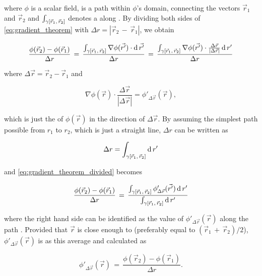 where $\phi$ is a scalar field, \textgammapath is a path within $\phi$'s domain, connecting the vectors $\vec{r}_1$ and $\vec{r}_2$ and $\int_{\gamma[\vec{r}_1,\,\vec{r}_2]}$ denotes a  along \textgammapath. By dividing both sides of \eqref{eq:gradient_theorem} with \mbox{$\Delta r = |\vec{r}_2\,-\,\vec{r}_1|$}, we obtain

\begin{equation} \label{eq:gradient_theorem_divided}
\frac{\phi(\vec{r}_2)-\phi(\vec{r}_1)}{\Delta r} \,=\, \frac{\int_{\gamma[\vec{r}_1,\,\vec{r}_2]}\nabla\phi(\vec{r'})\cdot \operatorname{d}\vec{r'}}{\Delta r} \,=\, \frac{\int_{\gamma[\vec{r}_1,\,\vec{r}_2]}\nabla\phi(\vec{r'})\cdot\frac{\Delta\vec{r}}{|\Delta\vec{r}|} \operatorname{d} r'}{\Delta r}
\end{equation}

where $\Delta\vec{r} = \vec{r}_2 -  \vec{r}_1$ and

\begin{equation}
\nabla\phi(\vec{r})\cdot\frac{\Delta\vec{r}}{|\Delta\vec{r}|} = \phi'_{\Delta\vec{r}}(\vec{r}),
\end{equation}

which is just the \derivative of $\phi(\vec{r})$ in the direction of $\Delta\vec{r}$. By assuming the simplest path possible from $r_1$ to $r_2$, which is just a straight line, $\Delta r$ can be written as

\begin{equation}
\Delta r = \int_{\gamma[\vec{r}_1,\,\vec{r}_2]}\operatorname{d} r'
\end{equation}

and \eqref{eq:gradient_theorem_divided} becomes

\begin{equation} \label{eq:phi_derivative_integral}
\frac{\phi(\vec{r}_2)-\phi(\vec{r}_1)}{\Delta r} \,=\, \frac{\int_{\gamma[\vec{r}_1,\,\vec{r}_2]}\phi'_{\Delta\vec{r}}(\vec{r'})\operatorname{d} r'}{\int_{\gamma[\vec{r}_1,\,\vec{r}_2]}\operatorname{d} r'}
\end{equation}

where the right hand side can be identified as the \average value of $\phi'_{\Delta\vec{r}}(\vec{r})$ along the path \textgammapath. Provided that $\vec{r}$ is close enough to \textgammapath (preferably equal to \mbox{$(\vec{r}_1\,+\,\vec{r}_2)/2$}), $\phi'_{\Delta\vec{r}}(\vec{r})$ is \approximated as this average and calculated as

\begin{equation} \label{eq:phi_derivative_final}
\phi'_{\Delta\vec{r}}(\vec{r}) \,=\, \frac{\phi(\vec{r}_2)-\phi(\vec{r}_1)}{\Delta r}.
\end{equation}

